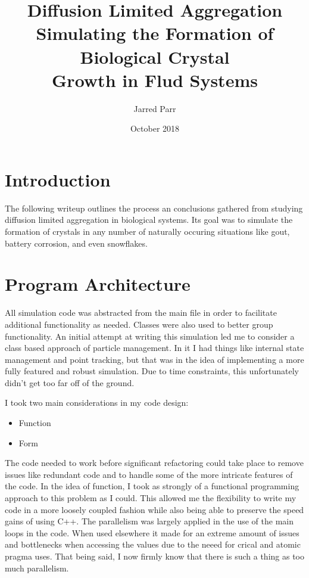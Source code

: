 \documentclass[11pt]{article}
\begin{document}
\title{%
  Diffusion Limited Aggregation \\
  \large Simulating the Formation of Biological Crystal \\
  Growth in Flud Systems}
\author{Jarred Parr}

\date{October 2018}
\maketitle

\section{Introduction}
The following writeup outlines the process an conclusions gathered from studying diffusion limited aggregation in biological systems. Its goal was to simulate the formation of crystals in any number of naturally occuring situations like gout, battery corrosion, and even snowflakes.

\section{Program Architecture}
All simulation code was abstracted from the main file in order to facilitate additional functionality as needed. Classes were also used to better group functionality. An initial attempt at writing this simulation led me to consider a class based approach of particle management. In it I had things like internal state management and point tracking, but that was in the idea of implementing a more fully featured and robust simulation. Due to time constraints, this unfortunately didn't get too far off of the ground.

I took two main considerations in my code design:
\begin{itemize}
  \item Function
  \item Form
\end{itemize}

The code needed to work before significant refactoring could take place to remove issues like redundant code and to handle some of the more intricate features of the code. In the idea of function, I took as strongly of a functional programming approach to this problem as I could. This allowed me the flexibility to write my code in a more loosely coupled fashion while also being able to preserve the speed gains of using C++. The parallelism was largely applied in the use of the main loops in the code. When used elsewhere it made for an extreme amount of issues and bottlenecks when accessing the values due to the neeed for crical and atomic pragma uses. That being said, I now firmly know that there is such a thing as too much parallelism.
\end{document}
